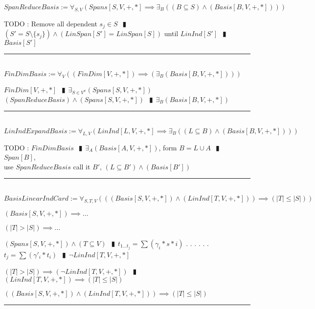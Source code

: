 \documentclass{book}
\newcommand{\abr}{:=}
\newcommand{\cont}{\phantom{.}. . .\phantom{.}}
\newcommand{\pipe}{$\phantom{(}\vrectangleblack\phantom{)}$}
\begin{document}
$SpanReduceBasis \abr \forall_{S, V}(Spans[S, V, +, *] \implies \exists_{B}((B \subseteq S) \land (Basis[B, V, +, *])))$
\begin{enumerate}
  \lit TODO : Remove all dependent $s_j \in S$ \pipe $(S' = S \setminus \{s_j\}) \land (LinSpan[S'] = LinSpan[S])$ until $LinInd[S']$ \pipe $Basis[S']$
\end{enumerate} \vspace{.75mm} \hrule \vspace{.75mm} \ \\ 

$FinDimBasis \abr \forall_{V}((FinDim[V, +, *]) \implies (\exists_{B}(Basis[B, V, +, *])))$
\begin{enumerate}
  \lit $FinDim[V, +, *]$ \pipe $\exists_{S \in V^n}(Spans[S, V, +, *])$
  \lit $(SpanReduceBasis) \land (Spans[S, V, +, *])$ \pipe $\exists_{B}(Basis[B, V, +, *])$
\end{enumerate} \vspace{.75mm} \hrule \vspace{.75mm} \ \\ 

$LinIndExpandBasis \abr \forall_{L, V}(LinInd[L, V, +, *] \implies \exists_{B}((L \subseteq B) \land (Basis[B, V, +, *])))$
\begin{enumerate}
  \lit TODO : $FinDimBasis$ \pipe $\exists_{A}(Basis[A, V, +, *])$, form $B = L \cup A$ \pipe $Span[B]$, \\
      use $SpanReduceBasis$ call it $B'$, $(L \subseteq B') \land (Basis[B'])$
\end{enumerate} \vspace{.75mm} \hrule \vspace{.75mm} \ \\ 

$BasisLinearIndCard \abr \forall_{S, T, V}(((Basis[S, V, +, *]) \land (LinInd[T, V, +, *])) \implies (|T| \leq |S|))$
\begin{enumerate}
  \lit $(Basis[S, V, +, *]) \implies \ldots$
  \begin{enumerate}
      \lit $(|T| > |S|) \implies \ldots$
      \begin{enumerate}
        \lit $(Spans[S, V, +, *]) \land (T \subseteq V)$ \pipe $t_{1 \ldots t_j} = \sum(\gamma_i * s*i)$ \cont
        \lit \cont $t_j = \sum(\gamma'_i * t_i)$ \pipe $\lnot LinInd[T, V, +, *]$
      \end{enumerate}
      \lit $(|T| > |S|) \implies (\lnot LinInd[T, V, +, *])$ \pipe $(LinInd[T, V, +, *]) \implies (|T| \leq |S|)$
   \end{enumerate}
  \lit $((Basis[S, V, +, *]) \land (LinInd[T, V, +, *])) \implies (|T| \leq |S|)$
\end{enumerate} \vspace{.75mm} \hrule \vspace{.75mm} \ \\ 
\end{document}

